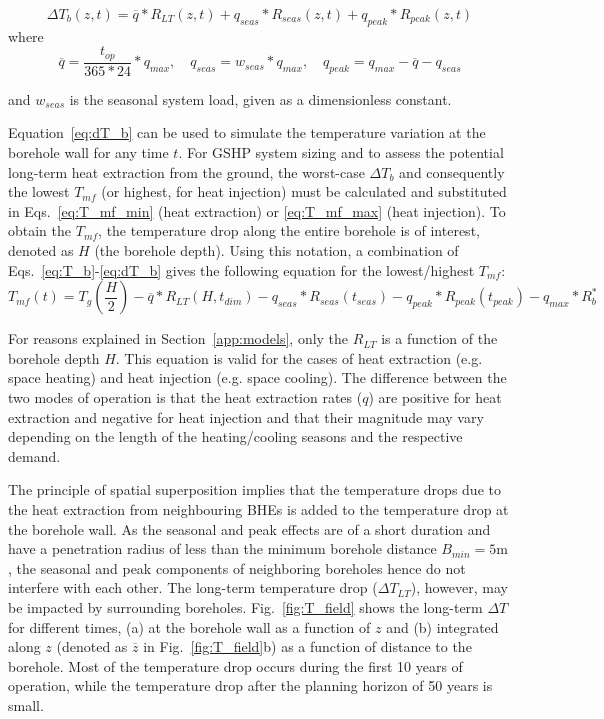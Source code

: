 \begin{equation}
\label{eq:dT_b}
    \textstyle \Delta T_b(z, t) = \overline{q} * R_{LT}(z, t) + q_{seas} * R_{seas}(z,t) + q_{peak} * R_{peak}(z, t)
\end{equation}
where
\begin{equation*}
    \overline{q} = \frac{t_{op}}{365*24} * q_\mathit{max}, \quad q_\mathit{seas} = w_\mathit{seas} * q_\mathit{max}, \quad q_\mathit{peak} = q_\mathit{max} - \overline{q} - q_\mathit{seas}
\end{equation*}

and $w_\mathit{seas}$ is the seasonal system load, given as a dimensionless constant.

Equation~\ref{eq:dT_b} can be used to simulate the temperature variation at the borehole wall for any time $t$. 
For GSHP system sizing and to assess the potential long-term heat extraction from the ground, the worst-case $\Delta T_b$ and consequently the lowest $T_{mf}$ (or highest, for heat injection) must be calculated and substituted in Eqs.~\ref{eq:T_mf_min} (heat extraction) or \ref{eq:T_mf_max} (heat injection).
To obtain the $T_{mf}$, the temperature drop along the entire borehole is of interest, denoted as $H$ (the borehole depth).
Using this notation, a combination of Eqs.~\ref{eq:T_b}-\ref{eq:dT_b} gives the following equation for the lowest/highest $T_{mf}$:
\begin{equation}
\label{eq:T_mf}
   T_{mf}(t) =  \textstyle T_g\left(\frac{H}{2}\right) - \overline{q} * R_{LT}(H, t_\mathit{dim}) - q_{seas} * R_{seas}(t_\mathit{seas}) - q_{peak} * R_{peak}(t_\mathit{peak}) - q_\mathit{max}*R_b^*
\end{equation}

For reasons explained in Section~\ref{app:models}, only the $R_{LT}$ is a function of the borehole depth $H$.
This equation is valid for the cases of heat extraction (e.g. space heating) and heat injection (e.g. space cooling). The difference between the two modes of operation is that the heat extraction rates ($q$) are positive for heat extraction and negative for heat injection and that their magnitude may vary depending on the length of the heating/cooling seasons and the respective demand.

The principle of spatial superposition implies that the temperature drops due to the heat extraction from neighbouring BHEs is added to the temperature drop at the borehole wall. 
%
As the seasonal and peak effects are of a short duration and have a penetration radius of less than the minimum borehole distance $B_{min} = 5$m \cite{pahud_geothermal_2002}, the seasonal and peak components of neighboring boreholes hence do not interfere with each other.
%
The long-term temperature drop ($\Delta T_{LT}$), however, may be impacted by surrounding boreholes. Fig.~\ref{fig:T_field} shows the long-term $\Delta T$ for different times, (a) at the borehole wall as a function of $z$ and (b) integrated along $z$ (denoted as $\overline{z}$ in Fig.~\ref{fig:T_field}b) as a function of distance to the borehole. Most of the temperature drop occurs during the first 10 years of operation, while the temperature drop after the planning horizon of 50 years is small.

